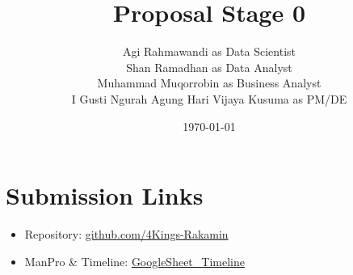 \documentclass[12pt]{article}
\title{Proposal Stage 0}
\author{
    Agi Rahmawandi as Data Scientist \\
    Shan Ramadhan as Data Analyst\\
    Muhammad Muqorrobin as Business Analyst\\
    I Gusti Ngurah Agung Hari Vijaya Kusuma as PM/DE
}\date{\today}
\begin{document}
\maketitle

\section*{Submission Links}
\begin{itemize}
  \item Repository: \href{https://github.com/4Kings-Rakamin}{github.com/4Kings-Rakamin}
  \item ManPro \& Timeline: \href{https://docs.google.com/spreadsheets/d/13lJC_6kToDdqyL0pbNBHhvBQwGvpJ8iTnGI4-eoNCsk/edit?gid=0#gid=0}{GoogleSheet\_Timeline}
\end{itemize}




\clearpage                 

\printbibliography[title={Daftar Pustaka}]
\end{document}
